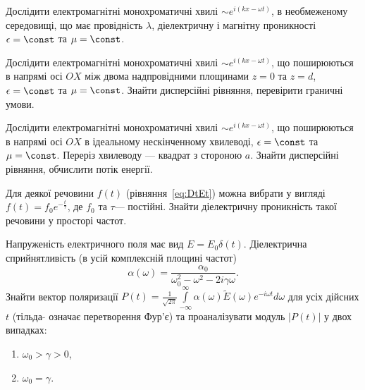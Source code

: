 \begin{problem}
Дослідити електромагнітні монохроматичні хвилі $\sim e^{i(kx - \omega t)}$, в необмеженому середовищі, що має провідність $\lambda$, діелектричну і магнітну проникності $\epsilon = \const$ та $\mu = \const$.
\end{problem}

\begin{problem}
Дослідити електромагнітні монохроматичні хвилі $\sim e^{i(kx - \omega t)}$, що поширюються в напрямі осі $OX$ між двома надпровідними площинами $z=0$ та $z=d$, $\epsilon = \const$ та $\mu = \const$. Знайти дисперсійні рівняння, перевірити граничні умови.
\end{problem}

\begin{problem}
Дослідити електромагнітні монохроматичні хвилі $\sim e^{i(kx - \omega t)}$, що поширюються в напрямі осі $OX$ в ідеальному нескінченному хвилеводі, $\epsilon = \const$ та $\mu = \const$. Переріз хвилеводу --- квадрат з стороною $a$. Знайти дисперсійні рівняння, обчислити потік енергії.
\end{problem}

\begin{problem}
Для деякої речовини $f(t)$ (рівняння~\eqref{eq:DtEt}) можна вибрати у вигляді $f(t) = f_0e^{-\frac{t}{\tau}}$, де $f_0$ та $\tau$--- постійні. Знайти діелектричну проникність такої речовини у просторі частот.
\end{problem}


\begin{problem}
Напруженість електричного поля має вид  $E = E_0\delta(t)$. Діелектрична сприйнятливість (в усій комплексній площині частот)
\[
	\alpha (\omega ) = \frac{\alpha _0}{\omega _0^2 - \omega ^2 - 2i\gamma \omega }.
\]
Знайти вектор поляризації $P(t) = \frac{1}{\sqrt{2\pi}}\int\limits_{- \infty }^\infty\alpha (\omega )\tilde E(\omega ){e^{ - i\omega t}}d\omega $ для усіх дійсних $t$  (тільда $\tilde{}$ означає перетворення Фур’є) та проаналізувати  модуль $|P(t)|$  у двох випадках:
\begin{enumerate}[label=\alph*)]
	\item $\omega_0 > \gamma >0$,
	\item $\omega_0 = \gamma$.
\end{enumerate}
\end{problem}

